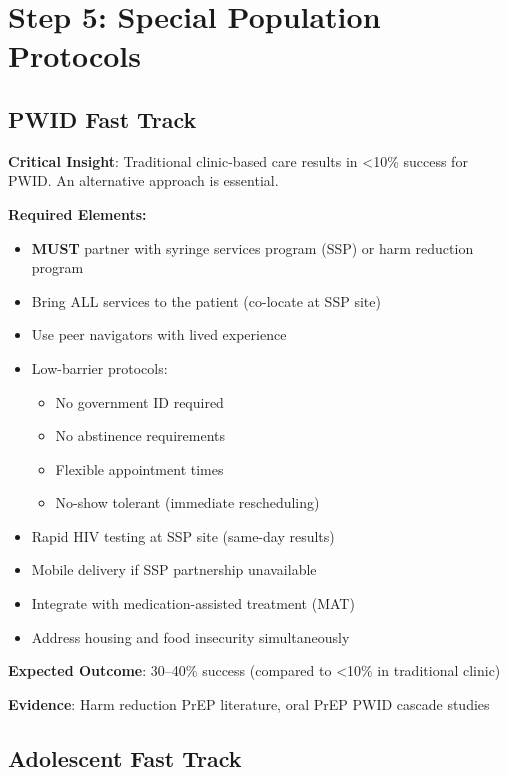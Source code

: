 \documentclass[11pt]{article}
\begin{document}
\section{Step 5: Special Population Protocols}

\subsection{PWID Fast Track}

\begin{tcolorbox}[colback=red!10!white,colframe=red!75!black,title=\textbf{People Who Inject Drugs: Alternative Care Model Required},breakable]
\textbf{Critical Insight}: Traditional clinic-based care results in <10\% success for PWID. An alternative approach is essential.

\textbf{Required Elements:}
\begin{itemize}[leftmargin=*]
\item \textbf{MUST} partner with syringe services program (SSP) or harm reduction program
\item Bring ALL services to the patient (co-locate at SSP site)
\item Use peer navigators with lived experience
\item Low-barrier protocols:
\begin{itemize}
\item No government ID required
\item No abstinence requirements
\item Flexible appointment times
\item No-show tolerant (immediate rescheduling)
\end{itemize}
\item Rapid HIV testing at SSP site (same-day results)
\item Mobile delivery if SSP partnership unavailable
\item Integrate with medication-assisted treatment (MAT)
\item Address housing and food insecurity simultaneously
\end{itemize}

\textbf{Expected Outcome}: 30--40\% success (compared to <10\% in traditional clinic)

\textbf{Evidence}: Harm reduction PrEP literature, oral PrEP PWID cascade studies
\end{tcolorbox}

\subsection{Adolescent Fast Track}
\end{document}
